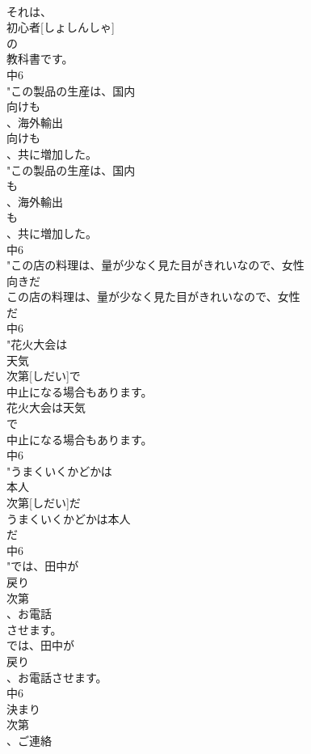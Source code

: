 \documentclass[8pt]{extreport}
\begin{document}
\begin{CJK}{UTF8}{min}
\\	それは、
\\	初心者[しょしんしゃ]
\\	の
\\	教科書です。
\\	中6
\\	"この製品の生産は、国内
\\	向けも
\\	、海外輸出
\\	向けも
\\	、共に増加した。
\\	"この製品の生産は、国内
\\	も
\\	、海外輸出
\\	も
\\	、共に増加した。
\\	中6
\\	"この店の料理は、量が少なく見た目がきれいなので、女性
\\	向きだ
\\	この店の料理は、量が少なく見た目がきれいなので、女性
\\	だ
\\	中6
\\	"花火大会は
\\	天気
\\	次第[しだい]で
\\	中止になる場合もあります。
\\	花火大会は天気
\\	で
\\	中止になる場合もあります。
\\	中6
\\	"うまくいくかどかは
\\	本人
\\	次第[しだい]だ
\\	うまくいくかどかは本人
\\	だ
\\	中6
\\	"では、田中が
\\	戻り
\\	次第
\\	、お電話
\\	させます。
\\	では、田中が
\\	戻り
\\	、お電話させます。
\\	中6
\\	決まり
\\	次第
\\	、ご連絡

\end{CJK}
\end{document}
